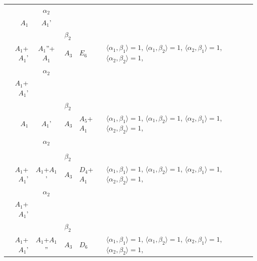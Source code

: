 \documentclass[12pt]{report}
\begin{document}
\begin{appendix}
{\begin{longtable}{rcl p{1cm}p{1cm}p{3cm} }
\\
\begin{tabular}{cc}$\alpha_1$+ & $\alpha_2$\\\tiny{ $A_1$ } & \tiny{ $A_1$' }\end{tabular} &\begin{tabular}{c} = \\~ \end{tabular} & \begin{tabular}{cc}$\beta_1$+ & $\beta_2$\\\tiny{ $A_1$+$A_1$' } & \tiny{ $A_1$''+$A_1$ }\end{tabular} & $A_3$ & $E_6$ &  $\langle\alpha_1, \beta_1\rangle=1$, $\langle\alpha_1, \beta_2\rangle=1$, $\langle\alpha_2, \beta_1\rangle=1$, $\langle\alpha_2, \beta_2\rangle=1$, 
\\
\begin{tabular}{cc}$\alpha_1$+ & $\alpha_2$\\\tiny{ $A_1$+$A_1$' } & \tiny{  }\end{tabular} &\begin{tabular}{c} = \\~ \end{tabular} & \begin{tabular}{cc}$\beta_1$+ & $\beta_2$\\\tiny{ $A_1$ } & \tiny{ $A_1$' }\end{tabular} & $A_3$ & $A_5$+$A_1$ &  $\langle\alpha_1, \beta_1\rangle=1$, $\langle\alpha_1, \beta_2\rangle=1$, $\langle\alpha_2, \beta_1\rangle=1$, $\langle\alpha_2, \beta_2\rangle=1$, 
\\
\begin{tabular}{cc}$\alpha_1$+ & $\alpha_2$\\\tiny{  } & \tiny{  }\end{tabular} &\begin{tabular}{c} = \\~ \end{tabular} & \begin{tabular}{cc}$\beta_1$+ & $\beta_2$\\\tiny{ $A_1$+$A_1$' } & \tiny{ $A_1$+$A_1$' }\end{tabular} & $A_3$ & $D_4$+$A_1$ &  $\langle\alpha_1, \beta_1\rangle=1$, $\langle\alpha_1, \beta_2\rangle=1$, $\langle\alpha_2, \beta_1\rangle=1$, $\langle\alpha_2, \beta_2\rangle=1$, 
\\
\begin{tabular}{cc}$\alpha_1$+ & $\alpha_2$\\\tiny{ $A_1$+$A_1$' } & \tiny{  }\end{tabular} &\begin{tabular}{c} = \\~ \end{tabular} & \begin{tabular}{cc}$\beta_1$+ & $\beta_2$\\\tiny{ $A_1$+$A_1$' } & \tiny{ $A_1$+$A_1$'' }\end{tabular} & $A_3$ & $D_6$ &  $\langle\alpha_1, \beta_1\rangle=1$, $\langle\alpha_1, \beta_2\rangle=1$, $\langle\alpha_2, \beta_1\rangle=1$, $\langle\alpha_2, \beta_2\rangle=1$, 

\end{longtable}}
\end{appendix}
\end{document}
